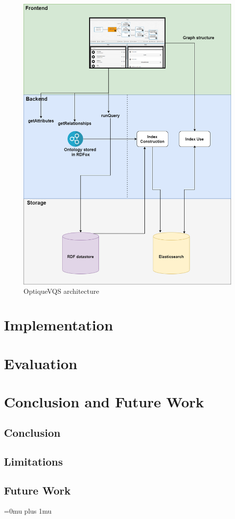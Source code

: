 \documentclass[a4paper,english]{ifimaster/ifimaster}
\begin{document}
\begin{figure}[htp]
    \centering
    \includegraphics[width=12cm]{images/master-arch.png}
    \caption{OptiqueVQS architecture}
    \label{fig:optiqueVQS_architecture}
\end{figure}

\chapter{Implementation}

\chapter{Evaluation}

\chapter{Conclusion and Future Work}
\section{Conclusion}
\section{Limitations}
\section{Future Work}


\newpage
\Urlmuskip=0mu plus 1mu\relax


\end{document}
